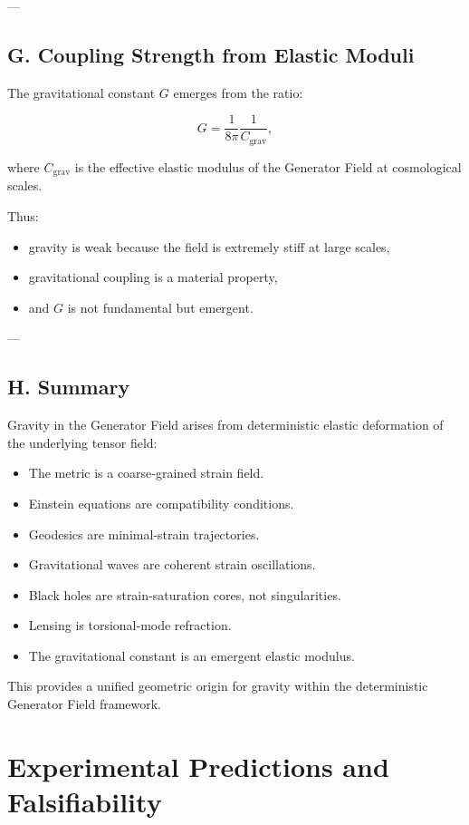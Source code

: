 \documentclass[reprint,amsmath,amssymb,aps,prl,floatfix]{revtex4-2}
\begin{document}
\begin{itemize}
---

\subsection{G. Coupling Strength from Elastic Moduli}

The gravitational constant \(G\) emerges from the ratio:

\[
G
=
\frac{1}{8\pi}
\frac{1}{C_{\mathrm{grav}}},
\]

where \(C_{\mathrm{grav}}\) is the effective elastic modulus of the Generator Field at cosmological scales.

Thus:

\begin{itemize}
\item gravity is weak because the field is extremely stiff at large scales,  
\item gravitational coupling is a material property,  
\item and \(G\) is not fundamental but emergent.
\end{itemize}

---

\subsection{H. Summary}

Gravity in the Generator Field arises from deterministic elastic deformation of the underlying tensor field:

\begin{itemize}
\item The metric is a coarse‑grained strain field.  
\item Einstein equations are compatibility conditions.  
\item Geodesics are minimal‑strain trajectories.  
\item Gravitational waves are coherent strain oscillations.  
\item Black holes are strain‑saturation cores, not singularities.  
\item Lensing is torsional‑mode refraction.  
\item The gravitational constant is an emergent elastic modulus.
\end{itemize}

This provides a unified geometric origin for gravity within the deterministic Generator Field framework.

\section{Experimental Predictions and Falsifiability}


\end{itemize}
\end{document}
